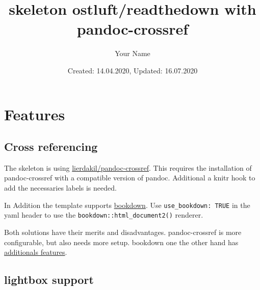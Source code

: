 \documentclass[
]{article}
\title{skeleton ostluft/readthedown with pandoc-crossref}
\author{Your Name}
\date{Created: 14.04.2020, Updated: 16.07.2020}
\makeatletter
\def\fps@figure{htbp}
\makeatother
\begin{document}
\makeatletter\renewcommand*{\fps@figure}{H}\makeatother

\begin{figure}[t]
\hfill
{}
\end{figure}

\maketitle

\hypertarget{features}{%
\section{Features}\label{features}}

\hypertarget{cross-referencing}{%
\subsection{Cross referencing}\label{cross-referencing}}

The skeleton is using
\href{https://github.com/lierdakil/pandoc-crossref}{lierdakil/pandoc-crossref}.
This requires the installation of pandoc-crossref with a compatible
version of pandoc. Additional a knitr hook to add the necessaries labels
is needed.

In Addition the template supports
\href{https://github.com/rstudio/bookdown}{bookdown}. Use
\texttt{use\_bookdown:\ TRUE} in the yaml header to use the
\texttt{bookdown::html\_document2()} renderer.

Both solutions have their merits and disadvantages. pandoc-crossref is
more configurable, but also needs more setup. bookdown one the other
hand has
\href{https://bookdown.org/yihui/bookdown/motivation.html}{additionals
features}.

\hypertarget{lightbox-support}{%
\subsection{lightbox support}\label{lightbox-support}}
\end{document}
